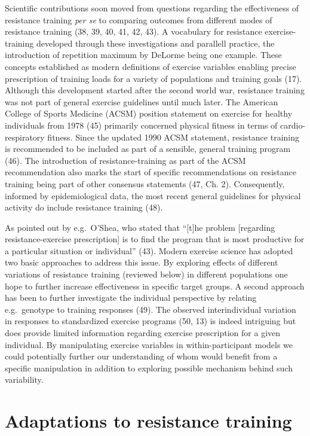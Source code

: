 \documentclass[twoside,10pt]{gihclass} %
\begin{document}
Scientific contributions soon moved from questions regarding the effectiveness of resistance training \emph{per se} to comparing outcomes from different modes of resistance training
(38, 39, 40, 41, 42, 43).
A vocabulary for resistance exercise-training developed through these investigations and parallell practice,
the introduction of repetition maximum by DeLorme being one example. These concepts established as modern definitions of exercise variables enabling precise prescription of training loads for a variety of populations and training goals
(17).
Although this development started after the second world war, resistance training was not part of general exercise guidelines until much later.
The American College of Sports Medicine (ACSM) position statement on exercise for healthy individuals from 1978 (45)
primarily concerned physical fitness in terms of cardio-respiratory fitness.
Since the updated 1990 ACSM statement, resistance training is recommended to be included as part of a sensible, general training program (46).
The introduction of resistance-training as part of the ACSM recommendation also marks the start of specific recommendations on resistance training being part of other consensus statements
(47, Ch. 2).
Consequently, informed by epidemiological data, the most recent general guidelines for physical activity do include resistance training (48).

As pointed out by e.g.~O'Shea, who stated that ``{[}t{]}he problem {[}regarding resistance-exercise prescription{]} is to find the program that is most productive for a particular situation or individual''
(43).
Modern exercise science has adopted two basic approaches to address this issue. By exploring effects of different variations of resistance training (reviewed below) in different populations one hope to further increase effectiveness in specific target groups. A second approach has been to further investigate the individual perspective by relating e.g.~genotype to training responses
(49).
The observed interindividual variation in responses to standardized exercise programs
(50, 13)
is indeed intriguing but does provide limited information regarding exercise prescription for a given individual.
By manipulating exercise variables in within-participant models we could potentially further our understanding of whom would benefit from a specific manipulation in addition to exploring possible mechanism behind such variability.

\hypertarget{adaptations-to-resistance-training}{%
\section{Adaptations to resistance training}\label{adaptations-to-resistance-training}}
\end{document}
